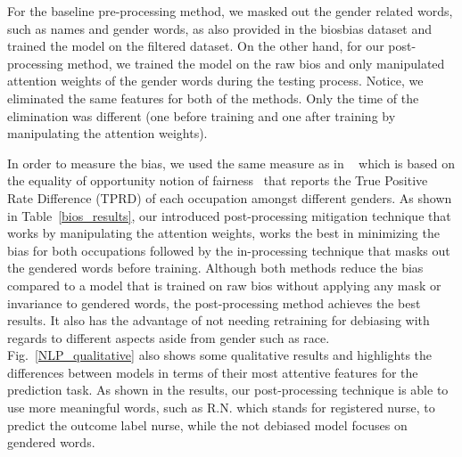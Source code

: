 For the baseline pre-processing method, we masked out the gender related words, such as names and gender words, as also provided in the biosbias dataset and trained the model on the filtered dataset. On the other hand, for our post-processing method, we trained the model on the raw bios and only manipulated attention weights of the gender words during the testing process. Notice, we eliminated the same features for both of the methods. Only the time of the elimination was different (one before training and one after training by manipulating the attention weights).

In order to measure the bias, we used the same measure as in ~\cite{de2019bias} which is based on the equality of opportunity notion of fairness~\cite{NIPS2016_9d268236} that reports the True Positive Rate Difference (TPRD) of each occupation amongst different genders. As shown in Table~\ref{bios_results}, our introduced post-processing mitigation technique that works by manipulating the attention weights, works the best in minimizing the bias for both occupations followed by the in-processing technique that masks out the gendered words before training. Although both methods reduce the bias compared to a model that is trained on raw bios without applying any mask or invariance to gendered words, the post-processing method achieves the best results. It also has the advantage of not needing retraining for debiasing with regards to different aspects aside from gender such as race. Fig.~\ref{NLP_qualitative} also shows some qualitative results and highlights the differences between models in terms of their most attentive features for the prediction task. As shown in the results, our post-processing technique is able to use more meaningful words, such as R.N. which stands for registered nurse, to predict the outcome label nurse, while the not debiased model focuses on gendered words.



